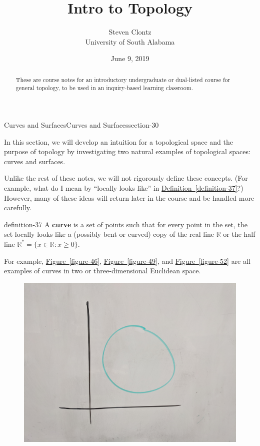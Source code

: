 \documentclass[oneside,10pt,]{article}
\title{Intro to Topology}
\author{Steven Clontz\\
University of South Alabama
}
\date{June 9, 2019}
\newcommand{\terminology}[1]{\textbf{#1}}
\begin{document}
\hypertarget{article-4}{}
\maketitle
\thispagestyle{empty}
\begin{abstract}
\hypertarget{p-14}{}%
These are course notes for an introductory undergraduate or dual-listed course for general topology, to be used in an inquiry-based learning classroom.%
\end{abstract}
%
%
\typeout{************************************************}
\typeout{************************************************}
%
\begin{sectionptx}{Curves and Surfaces}{}{Curves and Surfaces}{}{}{section-30}
\begin{introduction}{}%
\hypertarget{p-33}{}%
In this section, we will develop an intuition for a topological space and the purpose of topology by investigating two natural examples of topological spaces: curves and surfaces.%
\par
\hypertarget{p-34}{}%
Unlike the rest of these notes, we will not rigorously define these concepts. (For example, what do I mean by ``locally looks like'' in \hyperref[definition-37]{Definition~\ref{definition-37}}?)  However, many of these ideas will return later in the course and be handled more carefully.%
\end{introduction}%
\begin{definition}{}{definition-37}%
\hypertarget{p-38}{}%
A \terminology{curve} is a set of points such that for every point in the set, the set locally looks like a (possibly bent or curved) copy of the real line \(\mathbb R\) or the half line \(\mathbb R^*=\{x\in\mathbb R:x\geq 0\}\).%
\end{definition}
\hypertarget{p-42}{}%
For example, \hyperref[figure-46]{Figure~\ref{figure-46}}, \hyperref[figure-49]{Figure~\ref{figure-49}}, and \hyperref[figure-52]{Figure~\ref{figure-52}} are all examples of curves in two or three-dimensional Euclidean space.%
\begin{figure}
\centering
\includegraphics[width=1\linewidth]{images/circle.jpg}

\end{figure}
\end{sectionptx}
\end{document}
